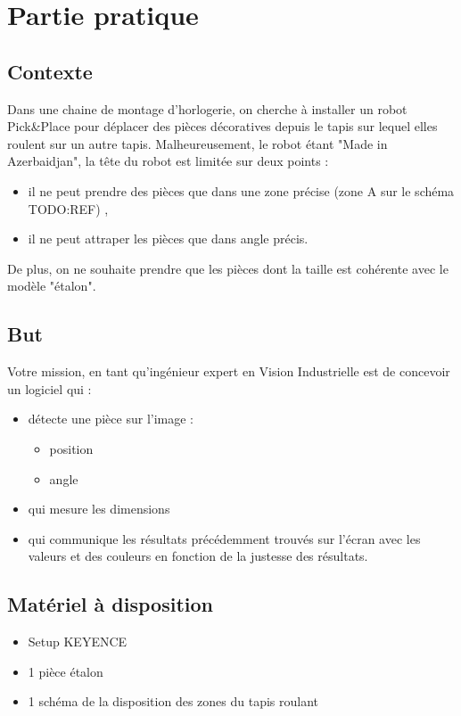 \section{Partie pratique}

\subsection{Contexte}
Dans une chaine de montage d'horlogerie, on cherche à installer un robot Pick\&Place pour
déplacer des pièces décoratives depuis le tapis sur lequel elles roulent sur un autre tapis.
Malheureusement, le robot étant "Made in Azerbaidjan", la tête du robot est limitée sur deux
points :

\vspace{0.2cm}
\begin{itemize}
  \item il ne peut prendre des pièces que dans une zone précise (zone A sur le schéma TODO:REF) ,
  \item il ne peut attraper les pièces que dans angle précis.
\end{itemize}
\vspace{0.2cm}

\noindent
De plus, on ne souhaite prendre que les pièces dont la taille est cohérente avec le modèle "étalon".


\subsection{But}
\noindent Votre mission, en tant qu'ingénieur expert en Vision Industrielle est de concevoir un logiciel qui :
\begin{itemize}
  \item détecte une pièce sur l'image :
  \begin{itemize}
    \item position
    \item angle  
  \end{itemize}
  \item qui mesure les dimensions
  \item qui communique les résultats précédemment trouvés sur l'écran avec les valeurs et des
  couleurs en fonction de la justesse des résultats.
\end{itemize}

 
\subsection{Matériel à disposition}
\begin{itemize}
  \item Setup KEYENCE
  \item 1 pièce étalon
  \item 1 schéma de la disposition des zones du tapis roulant
\end{itemize}


